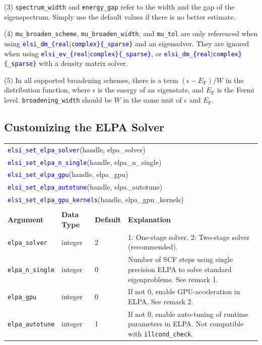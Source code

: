 \documentclass{report}
\newcommand{\api}[1]{\textcolor{blue}{\texttt{#1}}}
\begin{document}
(3) \texttt{spectrum\_width} and \texttt{energy\_gap} refer to the width and the gap of the eigenspectrum. Simply use the default values if there is no better estimate.

(4) \texttt{mu\_broaden\_scheme}, \texttt{mu\_broaden\_width}, and  \texttt{mu\_tol} are only referenced when using \api{elsi\_dm\_\{real$\vert$complex\}\{\_sparse\}} and an eigensolver. They are ignored when using \api{elsi\_ev\_\{real$\vert$complex\}\{\_sparse\}}, or \api{elsi\_dm\_\{real$\vert$complex\}\{\_sparse\}} with a density matrix solver.

(5) In all supported broadening schemes, there is a term $(\epsilon - E_\text{F})/W$ in the distribution function, where $\epsilon$ is the energy of an eigenstate, and $E_\text{F}$ is the Fermi level. \texttt{broadening\_width} should be $W$ in the same unit of $\epsilon$ and $E_\text{F}$.

\subsection{Customizing the ELPA Solver}
\label{subsec:setter_elpa}
\begin{tabular}[]{|p{30mm}|p{20mm}|p{15mm}|p{97mm}|}
\multicolumn{4}{l}{\api{elsi\_set\_elpa\_solver}(handle, elpa\_solver)}\\
\multicolumn{4}{l}{\api{elsi\_set\_elpa\_n\_single}(handle, elpa\_n\_single)}\\
\multicolumn{4}{l}{\api{elsi\_set\_elpa\_gpu}(handle, elpa\_gpu)}\\
\multicolumn{4}{l}{\api{elsi\_set\_elpa\_autotune}(handle, elpa\_autotune)}\\
\multicolumn{4}{l}{\api{elsi\_set\_elpa\_gpu\_kernels}(handle, elpa\_gpu\_kernels)}\\
\multicolumn{4}{l}{}\\
\hline
\multicolumn{1}{|l|}{\textbf{Argument}} & \multicolumn{1}{l|}{\textbf{Data Type}} & \multicolumn{1}{l|}{\textbf{Default}} & \multicolumn{1}{l|}{\textbf{Explanation}}\\
\hline
\texttt{elpa\_solver}       & integer & 2 & 1: One-stage solver. 2: Two-stage solver (recommended).\\
\hline
\texttt{elpa\_n\_single}    & integer & 0 & Number of SCF steps using single precision ELPA to solve standard eigenproblems. See remark 1.\\
\hline
\texttt{elpa\_gpu}          & integer & 0 & If not 0, enable GPU-acceleration in ELPA. See remark 2.\\
\hline
\texttt{elpa\_autotune}     & integer & 1 & If not 0, enable auto-tuning of runtime parameters in ELPA. Not compatible with \texttt{illcond\_check}.\\
\hline
\end{tabular}
\end{document}
